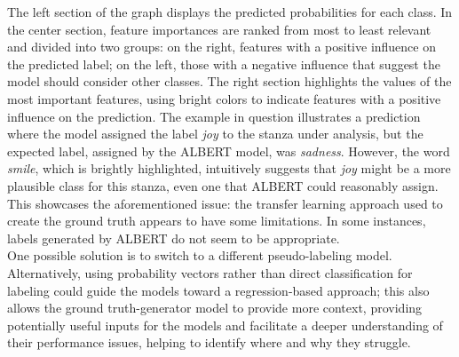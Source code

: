 The left section of the graph displays the
predicted probabilities for each class. In the center section,
feature importances are ranked from most to least relevant and divided into two
groups: on the right,
features with a positive influence on the predicted label; on the left, those
with a negative influence that suggest the model should consider other classes.
The right section highlights the values of the most important
features, using bright colors to indicate features with a positive influence on the
prediction.
The example in question illustrates a prediction where the model assigned the label \textit{joy} to the stanza under analysis, but the expected label, assigned by the ALBERT model, was \textit{sadness}.
However, the word \textit{smile}, which is brightly highlighted, intuitively suggests that \textit{joy} might be a more plausible class for this stanza, even one that ALBERT could reasonably assign. 
This showcases the aforementioned issue: the transfer learning approach used to
create the ground truth appears to have some limitations. In some instances, labels
generated by ALBERT do not seem to be appropriate.\\

One possible solution is to switch to a different pseudo-labeling model.
Alternatively, using probability vectors rather than direct classification for
labeling could guide the models toward a regression-based approach; this also
allows the ground truth-generator model to provide more context, providing potentially
useful inputs for the models and facilitate a deeper understanding of their
performance issues, helping to identify where and why they struggle.

